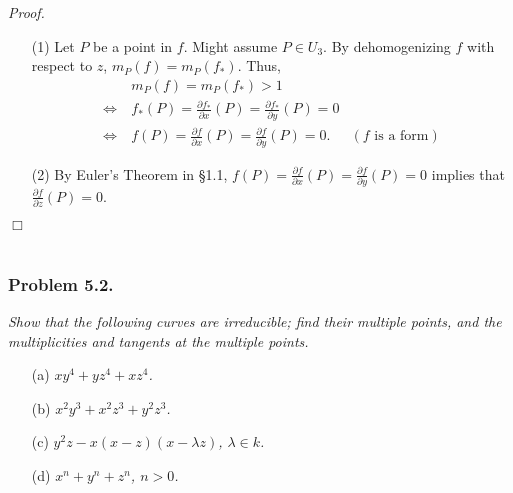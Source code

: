 \documentclass{article}
\begin{document}
\emph{Proof.}
\begin{enumerate}
\item[(1)]
  Let $P$ be a point in $f$.
  Might assume $P \in U_3$.
  By dehomogenizing $f$ with respect to $z$, $m_P(f) = m_P(f_{*})$.
  Thus,
  \begin{align*}
    & \: m_P(f) = m_P(f_{*}) > 1 \\
    \Longleftrightarrow & \:
    f_{*}(P)
    = \frac{\partial f_{*}}{\partial x}(P)
    = \frac{\partial f_{*}}{\partial y}(P)
    = 0 \\
    \Longleftrightarrow & \:
    f(P)
    = \frac{\partial f}{\partial x}(P)
    = \frac{\partial f}{\partial y}(P)
    = 0.
      &(\text{$f$ is a form})
  \end{align*}

\item[(2)]
  By Euler's Theorem in \S 1.1,
  $f(P) = \frac{\partial f}{\partial x}(P) = \frac{\partial f}{\partial y}(P) = 0$
  implies that $\frac{\partial f}{\partial z}(P) = 0$.
\end{enumerate}
$\Box$ \\\\






\subsubsection*{Problem 5.2.}
\emph{Show that the following curves are irreducible;
find their multiple points, and the multiplicities and tangents at the multiple points.}
\begin{enumerate}
\item[(a)]
  \emph{$xy^4 + yz^4 + xz^4$.}

\item[(b)]
  \emph{$x^2y^3 + x^2z^3 + y^2z^3$.}

\item[(c)]
  \emph{$y^2z - x(x-z)(x-\lambda z)$, $\lambda \in k$.}

\item[(d)]
  \emph{$x^n + y^n + z^n$, $n > 0$.} \\
\end{enumerate}
\end{document}
